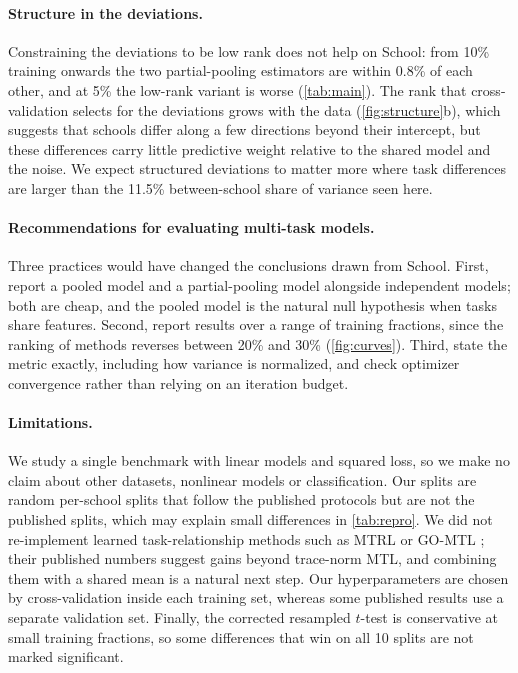 \paragraph{Structure in the deviations.}
Constraining the deviations to be low rank does not help on School: from 10\% training onwards the two partial-pooling estimators are within 0.8\% of each other, and at 5\% the low-rank variant is worse (\cref{tab:main}). The rank that cross-validation selects for the deviations grows with the data (\cref{fig:structure}b), which suggests that schools differ along a few directions beyond their intercept, but these differences carry little predictive weight relative to the shared model and the noise. We expect structured deviations to matter more where task differences are larger than the 11.5\% between-school share of variance seen here.

\paragraph{Recommendations for evaluating multi-task models.}
Three practices would have changed the conclusions drawn from School. First, report a pooled model and a partial-pooling model alongside independent models; both are cheap, and the pooled model is the natural null hypothesis when tasks share features. Second, report results over a range of training fractions, since the ranking of methods reverses between 20\% and 30\% (\cref{fig:curves}). Third, state the metric exactly, including how variance is normalized, and check optimizer convergence rather than relying on an iteration budget.

\paragraph{Limitations.}
We study a single benchmark with linear models and squared loss, so we make no claim about other datasets, nonlinear models or classification. Our splits are random per-school splits that follow the published protocols but are not the published splits, which may explain small differences in \cref{tab:repro}. We did not re-implement learned task-relationship methods such as MTRL \citep{zhang2010convex} or GO-MTL \citep{kumar2012learning}; their published numbers suggest gains beyond trace-norm MTL, and combining them with a shared mean is a natural next step. Our hyperparameters are chosen by cross-validation inside each training set, whereas some published results use a separate validation set. Finally, the corrected resampled $t$-test is conservative at small training fractions, so some differences that win on all 10 splits are not marked significant.
